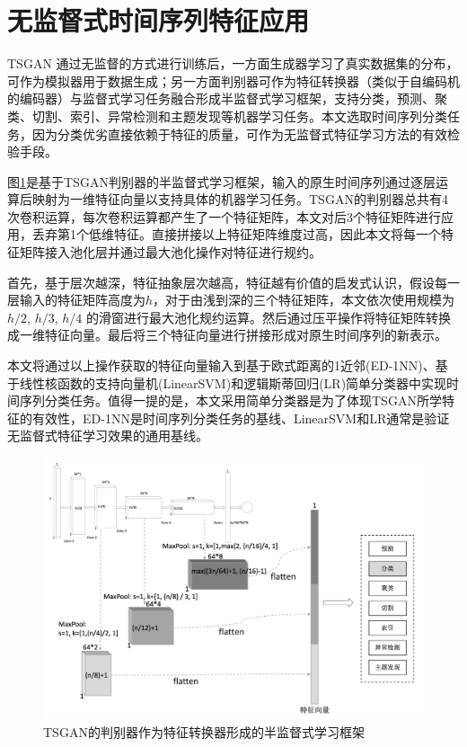 \section{无监督式时间序列特征应用}

TSGAN 通过无监督的方式进行训练后，一方面生成器学习了真实数据集的分布，可作为模拟器用于数据生成；另一方面判别器可作为特征转换器（类似于自编码机的编码器）与监督式学习任务融合形成半监督式学习框架，支持分类，预测、聚类、切割、索引、异常检测和主题发现等机器学习任务。本文选取时间序列分类任务，因为分类优劣直接依赖于特征的质量，可作为无监督式特征学习方法的有效检验手段。

图\ref{fig:gan-semi-supervised-learning}是基于TSGAN判别器的半监督式学习框架，输入的原生时间序列通过逐层运算后映射为一维特征向量以支持具体的机器学习任务。TSGAN的判别器总共有4次卷积运算，每次卷积运算都产生了一个特征矩阵，本文对后3个特征矩阵进行应用，丢弃第1个低维特征。直接拼接以上特征矩阵维度过高，因此本文将每一个特征矩阵接入池化层并通过最大池化操作对特征进行规约。

首先，基于层次越深，特征抽象层次越高，特征越有价值的启发式认识，假设每一层输入的特征矩阵高度为$h$，对于由浅到深的三个特征矩阵，本文依次使用规模为 $h/2$, $h/3$, $h/4$ 的滑窗进行最大池化规约运算。然后通过压平操作将特征矩阵转换成一维特征向量。最后将三个特征向量进行拼接形成对原生时间序列的新表示。

本文将通过以上操作获取的特征向量输入到基于欧式距离的1近邻(ED-1NN)、基于线性核函数的支持向量机(LinearSVM)和逻辑斯蒂回归(LR)简单分类器中实现时间序列分类任务。值得一提的是，本文采用简单分类器是为了体现TSGAN所学特征的有效性，ED-1NN是时间序列分类任务的基线、LinearSVM和LR通常是验证无监督式特征学习效果的通用基线。

\begin{figure}[H]
\centering
\includegraphics[scale=0.6]{figures/gan-semi-supervised-learning.png}
\caption{TSGAN的判别器作为特征转换器形成的半监督式学习框架}
\label{fig:gan-semi-supervised-learning}
\end{figure}

